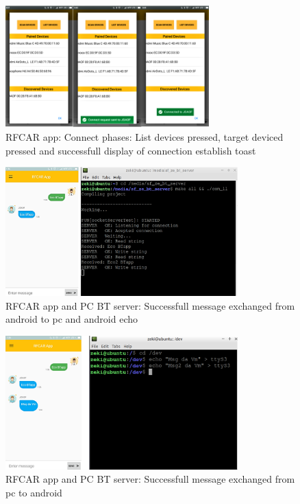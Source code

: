 %
\newpage
\begin{figure}[!hbt]
\centering
\includegraphics[width=0.7\textwidth]{img/bt_sequence_connect.png}
\caption{\label{fig:bt_sequence_connect}RFCAR app: Connect phases: List devices pressed, target deviced pressed and successfull display of connection establish toast}
\end{figure}
%
\begin{figure}[!hbt]
\centering
\includegraphics[width=0.8\textwidth]{img/bt_sendapp_recpc.png}
\caption{\label{fig:bt_sendapp_recpc}RFCAR app and PC BT server: Successfull message exchanged from android to pc and android echo}
\end{figure}
%
\begin{figure}[!hbt]
\centering
\includegraphics[width=0.8\textwidth]{img/bt_sendPC_recAPP.png}
\caption{\label{fig:bt_sendPC_recAPP}RFCAR app and PC BT server: Successfull message exchanged from pc to android}
\end{figure}
